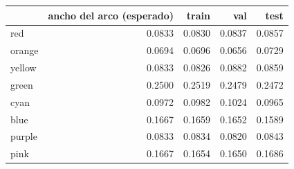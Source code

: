 \begin{tabular}{lrrrr}
\toprule
 & ancho del arco (esperado) & train & val & test \\
\midrule
red & 0.0833 & 0.0830 & 0.0837 & 0.0857 \\
orange & 0.0694 & 0.0696 & 0.0656 & 0.0729 \\
yellow & 0.0833 & 0.0826 & 0.0882 & 0.0859 \\
green & 0.2500 & 0.2519 & 0.2479 & 0.2472 \\
cyan & 0.0972 & 0.0982 & 0.1024 & 0.0965 \\
blue & 0.1667 & 0.1659 & 0.1652 & 0.1589 \\
purple & 0.0833 & 0.0834 & 0.0820 & 0.0843 \\
pink & 0.1667 & 0.1654 & 0.1650 & 0.1686 \\
\bottomrule
\end{tabular}
